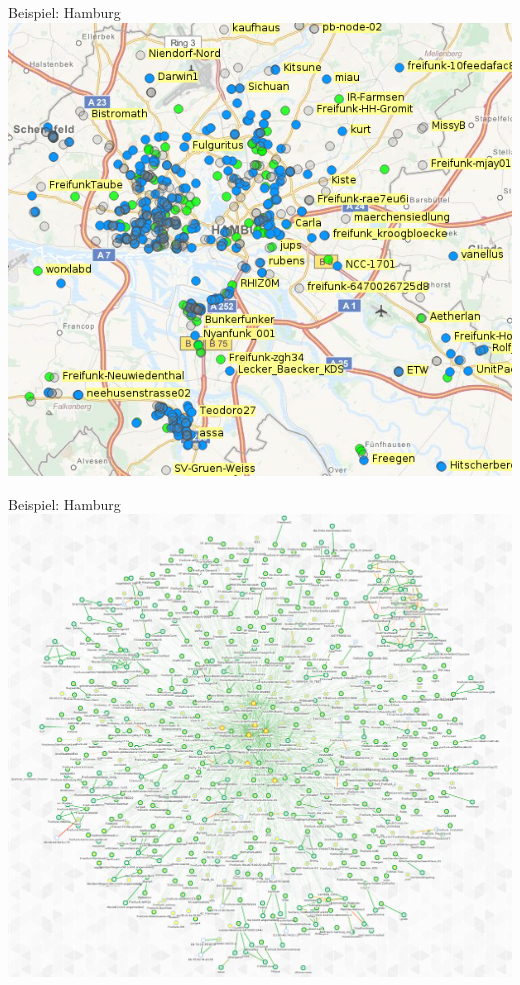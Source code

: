 \documentclass{beamer}
\begin{document}
\begin{frame}{Beispiel: Hamburg}
\vfill
\centering
\includegraphics[scale=0.4]{images/hamburg-map}
\vfill
\end{frame}

\begin{frame}{Beispiel: Hamburg}
\vfill
\centering
\includegraphics[scale=0.22]{images/hamburg-graph}
\vfill
\end{frame}
\end{document}
